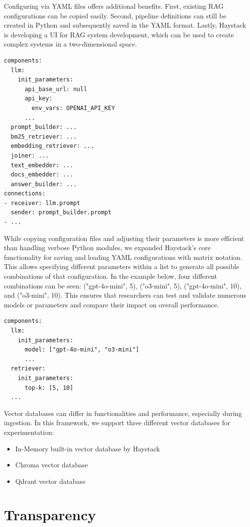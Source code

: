 Configuring via YAML files offers additional benefits. First, existing RAG configurations can be copied easily. Second, pipeline definitions can still be created in Python and subsequently saved in the YAML format. Lastly, Haystack is developing a UI \cite{haystack-ui} for RAG system development, which can be used to create complex systems in a two-dimensional space.

\begin{verbatim}
components:
  llm:
    init_parameters:
      api_base_url: null
      api_key:
        env_vars: OPENAI_API_KEY
      ...
  prompt_builder: ...
  bm25_retriever: ...
  embedding_retriever: ...
  joiner: ...
  text_embedder: ...
  docs_embedder: ...
  answer_builder: ...
connections:
- receiver: llm.prompt
  sender: prompt_builder.prompt
- ...
\end{verbatim}

While copying configuration files and adjusting their parameters is more efficient than handling verbose Python modules, we expanded Haystack's core functionality for saving and loading YAML configurations with matrix notation.
This allows specifying different parameters within a list to generate all possible combinations of that configuration. In the example below, four different combinations can be seen: ("gpt-4o-mini", 5), ("o3-mini", 5), ("gpt-4o-mini", 10), and ("o3-mini", 10). This ensures that researchers can test and validate numerous models or parameters and compare their impact on overall performance.

\begin{verbatim}
components:
  llm:
    init_parameters:
      model: ["gpt-4o-mini", "o3-mini"]
      ...
  retriever:
    init_parameters:
      top-k: [5, 10]
  ...
\end{verbatim}


Vector databases can differ in functionalities and performance, especially during ingestion. In this framework, we support three different vector databases for experimentation:
\begin{itemize}
  \item In-Memory built-in vector database by Haystack
  \item Chroma vector database \cite{Chroma}
  \item Qdrant vector database \cite{qdrant}
\end{itemize}

\section{Transparency}

